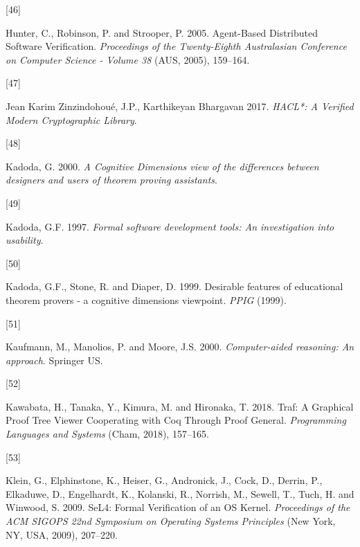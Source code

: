 \documentclass[
]{article}
\newlength{\cslhangindent}
\newlength{\csllabelwidth}
\newlength{\cslentryspacingunit} %
\newenvironment{CSLReferences}[2] %
 {%
  \setlength{\parindent}{0pt}
  \ifodd #1
  \let\oldpar\par
  \def\par{\hangindent=\cslhangindent\oldpar}
  \fi
  \setlength{\parskip}{#2\cslentryspacingunit}
 }%
 {}
\newcommand{\CSLLeftMargin}[1]{\parbox[t]{\csllabelwidth}{#1}}
\newcommand{\CSLRightInline}[1]{\parbox[t]{\linewidth - \csllabelwidth}{#1}\break}
\begin{document}
\begin{CSLReferences}{0}{0}
\leavevmode{}%
\CSLLeftMargin{{[}46{]} }
\CSLRightInline{Hunter, C., Robinson, P. and Strooper, P. 2005.
Agent-{Based} {Distributed} {Software} {Verification}. \emph{Proceedings
of the {Twenty}-{Eighth} {Australasian} {Conference} on {Computer}
{Science} - {Volume} 38} (AUS, 2005), 159--164.}

\leavevmode{}%
\CSLLeftMargin{{[}47{]} }
\CSLRightInline{Jean Karim Zinzindohoué, J.P., Karthikeyan Bhargavan
2017. \emph{{HACL}*: {A} {Verified} {Modern} {Cryptographic}
{Library}}.}

\leavevmode{}%
\CSLLeftMargin{{[}48{]} }
\CSLRightInline{Kadoda, G. 2000. \emph{A {Cognitive} {Dimensions} view
of the differences between designers and users of theorem proving
assistants}.}

\leavevmode{}%
\CSLLeftMargin{{[}49{]} }
\CSLRightInline{Kadoda, G.F. 1997. \emph{Formal software development
tools: An investigation into usability}.}

\leavevmode{}%
\CSLLeftMargin{{[}50{]} }
\CSLRightInline{Kadoda, G.F., Stone, R. and Diaper, D. 1999. Desirable
features of educational theorem provers - a cognitive dimensions
viewpoint. \emph{{PPIG}} (1999).}

\leavevmode{}%
\CSLLeftMargin{{[}51{]} }
\CSLRightInline{Kaufmann, M., Manolios, P. and Moore, J.S. 2000.
\emph{Computer-aided reasoning: An approach}. Springer US.}

\leavevmode{}%
\CSLLeftMargin{{[}52{]} }
\CSLRightInline{Kawabata, H., Tanaka, Y., Kimura, M. and Hironaka, T.
2018. Traf: {A} {Graphical} {Proof} {Tree} {Viewer} {Cooperating} with
{Coq} {Through} {Proof} {General}. \emph{Programming {Languages} and
{Systems}} (Cham, 2018), 157--165.}

\leavevmode{}%
\CSLLeftMargin{{[}53{]} }
\CSLRightInline{Klein, G., Elphinstone, K., Heiser, G., Andronick, J.,
Cock, D., Derrin, P., Elkaduwe, D., Engelhardt, K., Kolanski, R.,
Norrish, M., Sewell, T., Tuch, H. and Winwood, S. 2009. {SeL4}: {Formal}
{Verification} of an {OS} {Kernel}. \emph{Proceedings of the {ACM}
{SIGOPS} 22nd {Symposium} on {Operating} {Systems} {Principles}} (New
York, NY, USA, 2009), 207--220.}


\end{CSLReferences}
\end{document}

